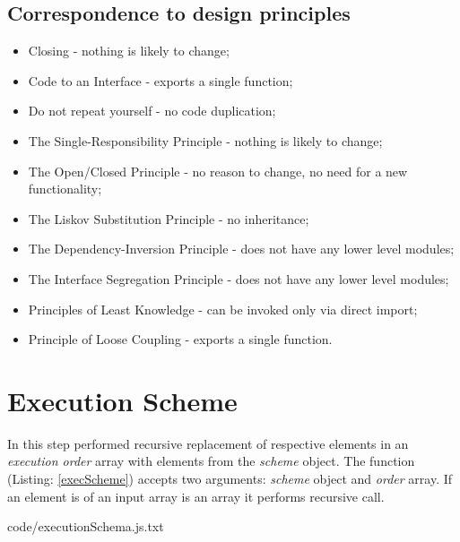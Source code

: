 \subsection{Correspondence to design principles}
\begin{itemize}
	\item Closing - nothing is likely to change;
	\item Code to an Interface - exports a single function;
	\item Do not repeat yourself - no code duplication;
	\item The Single-Responsibility Principle - nothing is likely to change;
	\item The Open/Closed Principle - no reason to change, no need for a new functionality;
	\item The Liskov Substitution Principle - no inheritance;
	\item The Dependency-Inversion Principle - does not have any lower level modules;
	\item The Interface Segregation Principle - does not have any lower level modules;
	\item Principles of Least Knowledge -  can be invoked only via direct import;
	\item Principle of Loose Coupling - exports a single function.
\end{itemize}

\section{Execution Scheme}
\label{sec:execScheme}
In this step performed recursive replacement of respective elements in an \textit{execution order} array with elements from the \textit{scheme} object. The function (Listing: \ref{execScheme}) accepts two arguments: \textit{scheme} object and \textit{order} array. If an element is of an input array is an array it performs recursive call.


{code/executionSchema.js.txt}
